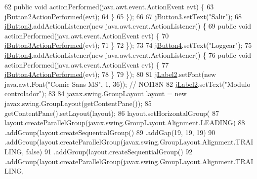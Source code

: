 \begin{DoxyCode}
62             \textcolor{keyword}{public} \textcolor{keywordtype}{void} actionPerformed(java.awt.event.ActionEvent evt) \{
63                 \mbox{\hyperlink{classpecl6part2_1_1_modulo_controlador_a7090e14e8838ee683046e423ff4f9945}{jButton2ActionPerformed}}(evt);
64             \}
65         \});
66 
67         \mbox{\hyperlink{classpecl6part2_1_1_modulo_controlador_a0e4337a4107a44ac33ceb447ee056f59}{jButton3}}.setText(\textcolor{stringliteral}{"Salir"});
68         \mbox{\hyperlink{classpecl6part2_1_1_modulo_controlador_a0e4337a4107a44ac33ceb447ee056f59}{jButton3}}.addActionListener(\textcolor{keyword}{new} java.awt.event.ActionListener() \{
69             \textcolor{keyword}{public} \textcolor{keywordtype}{void} actionPerformed(java.awt.event.ActionEvent evt) \{
70                 \mbox{\hyperlink{classpecl6part2_1_1_modulo_controlador_a404a336512bfd965be43078ee7382328}{jButton3ActionPerformed}}(evt);
71             \}
72         \});
73 
74         \mbox{\hyperlink{classpecl6part2_1_1_modulo_controlador_a0fd427b07850c91ef7c49d42321b6ec4}{jButton4}}.setText(\textcolor{stringliteral}{"Loggear"});
75         \mbox{\hyperlink{classpecl6part2_1_1_modulo_controlador_a0fd427b07850c91ef7c49d42321b6ec4}{jButton4}}.addActionListener(\textcolor{keyword}{new} java.awt.event.ActionListener() \{
76             \textcolor{keyword}{public} \textcolor{keywordtype}{void} actionPerformed(java.awt.event.ActionEvent evt) \{
77                 \mbox{\hyperlink{classpecl6part2_1_1_modulo_controlador_a997e0b7b9614d5bc98d2a9741aa49905}{jButton4ActionPerformed}}(evt);
78             \}
79         \});
80 
81         \mbox{\hyperlink{classpecl6part2_1_1_modulo_controlador_a322924ffd4409beca92e1f9ef6d108e5}{jLabel2}}.setFont(\textcolor{keyword}{new} java.awt.Font(\textcolor{stringliteral}{"Comic Sans MS"}, 1, 36)); \textcolor{comment}{// NOI18N}
82         \mbox{\hyperlink{classpecl6part2_1_1_modulo_controlador_a322924ffd4409beca92e1f9ef6d108e5}{jLabel2}}.setText(\textcolor{stringliteral}{"Modulo controlador"});
83 
84         javax.swing.GroupLayout layout = \textcolor{keyword}{new} javax.swing.GroupLayout(getContentPane());
85         getContentPane().setLayout(layout);
86         layout.setHorizontalGroup(
87             layout.createParallelGroup(javax.swing.GroupLayout.Alignment.LEADING)
88             .addGroup(layout.createSequentialGroup()
89                 .addGap(19, 19, 19)
90                 .addGroup(layout.createParallelGroup(javax.swing.GroupLayout.Alignment.TRAILING, \textcolor{keyword}{false})
91                     .addGroup(layout.createSequentialGroup()
92                         .addGroup(layout.createParallelGroup(javax.swing.GroupLayout.Alignment.TRAILING, \textcolor{keyword}{
}
\end{DoxyCode}
